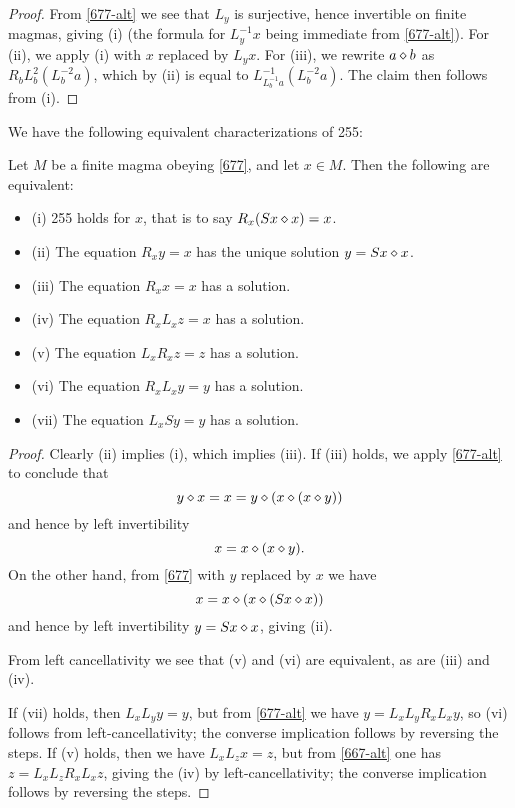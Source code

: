 \begin{proof}  From \eqref{677-alt} we see that $L_y$ is surjective, hence invertible on finite magmas, giving (i) (the formula for $L_y^{-1} x$ being immediate from \eqref{677-alt}).
  For (ii), we apply (i) with $x$ replaced by $L_y x$.  For (iii), we rewrite $a \diamond b$ as $R_b L_b^2 (L_b^{-2} a)$, which by (ii) is equal to $L_{L_b^{-1} a}^{-1} (L_b^{-2} a)$.  The claim then follows from (i).
\end{proof}

We have the following equivalent characterizations of 255:

\begin{lemma}\label{255-equiv} Let $M$ be a finite magma obeying \eqref{677}, and let $x \in M$.  Then the following are equivalent:
\begin{itemize}
  \item (i)  255 holds for $x$, that is to say $R_x (Sx \diamond x) = x$.
  \item (ii) The equation $R_x y = x$ has the unique solution $y = Sx \diamond x$.
  \item (iii) The equation $R_x x = x$ has a solution.
  \item (iv) The equation $R_x L_x z = x$ has a solution.
  \item (v) The equation $L_x R_x z = z$ has a solution.
  \item (vi) The equation $R_x L_x y = y$ has a solution.
  \item (vii) The equation $L_x S y = y$ has a solution.
\end{itemize}
\end{lemma}

\begin{proof} Clearly (ii) implies (i), which implies (iii).  If (iii) holds,
  we apply \eqref{677-alt} to conclude that
  $$ y \diamond x = x = y \diamond (x \diamond (x \diamond y))$$
  and hence by left invertibility
  $$ x = x \diamond (x \diamond y).$$
  On the other hand, from \eqref{677} with $y$ replaced by $x$ we have
  $$ x = x \diamond (x \diamond (Sx \diamond x))$$
 and hence by left invertibility $y = Sx \diamond x$, giving (ii).

From left cancellativity we see that (v) and (vi) are equivalent, as are (iii) and (iv).

If (vii) holds, then $L_x L_y y = y$, but from \eqref{677-alt} we have $y = L_x L_y R_x L_x y$, so (vi) follows from left-cancellativity; the converse implication follows by reversing the steps.  If (v) holds, then we have $L_x L_z x = z$, but from \eqref{667-alt} one has $z = L_x L_z R_x L_x z$, giving the (iv) by left-cancellativity; the converse implication follows by reversing the steps.
\end{proof}


